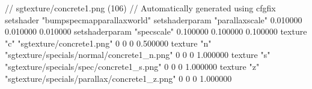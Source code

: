 // sgtexture/concrete1.png (106)
// Automatically generated using cfgfix
setshader "bumpspecmapparallaxworld"
setshaderparam "parallaxscale" 0.010000 0.010000 0.010000
setshaderparam "specscale" 0.100000 0.100000 0.100000
texture "c" "sgtexture/concrete1.png" 0 0 0 0.500000
texture "n" "sgtexture/specials/normal/concrete1_n.png" 0 0 0 1.000000
texture "s" "sgtexture/specials/spec/concrete1_s.png" 0 0 0 1.000000
texture "z" "sgtexture/specials/parallax/concrete1_z.png" 0 0 0 1.000000
